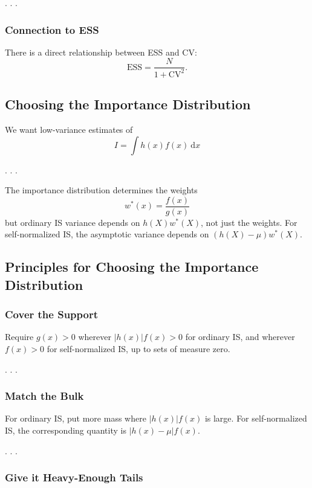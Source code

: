 \documentclass[
  letterpaper,
  DIV=11,
  numbers=noendperiod]{scrartcl}
\begin{document}
. . .

\subsubsection{Connection to ESS}\label{connection-to-ess}

There is a direct relationship between ESS and CV: \[
  \mathrm{ESS} = \frac{N}{1 + \mathrm{CV}^2}.
\]

\subsection{Choosing the Importance
Distribution}\label{choosing-the-importance-distribution}

We want low-variance estimates of \[
  I = \int h(x) f(x) \ \mathrm{d}x
\]

. . .

The importance distribution determines the weights \[
  w^*(x) = \frac{f(x)}{g(x)}
\] but ordinary IS variance depends on \(h(X)w^*(X)\), not just the
weights. For self-normalized IS, the asymptotic variance depends on
\((h(X) - \mu)w^*(X)\).

\subsection{Principles for Choosing the Importance
Distribution}\label{principles-for-choosing-the-importance-distribution}

\subsubsection{Cover the Support}\label{cover-the-support}

Require \(g(x) > 0\) wherever \(|h(x)|f(x) > 0\) for ordinary IS, and
wherever \(f(x) > 0\) for self-normalized IS, up to sets of measure
zero.

. . .

\subsubsection{Match the Bulk}\label{match-the-bulk}

For ordinary IS, put more mass where \(|h(x)|f(x)\) is large. For
self-normalized IS, the corresponding quantity is \(|h(x) - \mu|f(x)\).

. . .

\subsubsection{Give it Heavy-Enough
Tails}\label{give-it-heavy-enough-tails}
\end{document}
